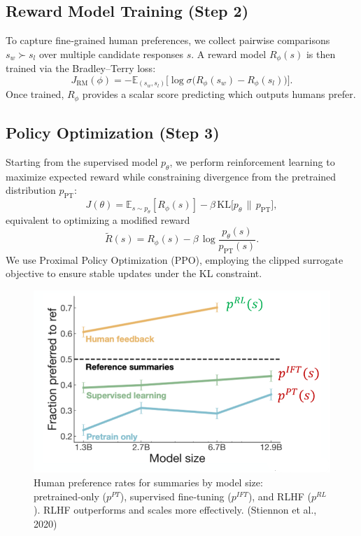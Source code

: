 \documentclass{article}
\begin{document}
\subsection{Reward Model Training (Step 2)}

To capture fine‑grained human preferences, we collect pairwise comparisons \(s_w \succ s_l\) over multiple candidate responses \(s\). A reward model \(R_\phi(s)\) is then trained via the Bradley–Terry loss:
\[
  J_{\mathrm{RM}}(\phi) = -\mathbb{E}_{(s_w,s_l)}\bigl[\log \sigma\bigl(R_\phi(s_w)-R_\phi(s_l)\bigr)\bigr].
\]
Once trained, \(R_\phi\) provides a scalar score predicting which outputs humans prefer.

\subsection{Policy Optimization (Step 3)}

Starting from the supervised model \(p_\theta\), we perform reinforcement learning to maximize expected reward while constraining divergence from the pretrained distribution \(p_{\mathrm{PT}}\):
\[
  J(\theta) = \mathbb{E}_{s\sim p_\theta}[R_\phi(s)] - \beta\,\mathrm{KL}\bigl[p_\theta \,\|\, p_{\mathrm{PT}}\bigr],
\]
equivalent to optimizing a modified reward
\[
  \widetilde R(s) = R_\phi(s) - \beta\,\log\frac{p_\theta(s)}{p_{\mathrm{PT}}(s)}.
\]
We use Proximal Policy Optimization (PPO), employing the clipped surrogate objective to ensure stable updates under the KL constraint.

\begin{figure}[ht]
    \centering
    \includegraphics[width=0.65\linewidth]{graphics/S11RLHF/performance_rlhf.png}
    \caption{Human preference rates for summaries by model size: pretrained‑only (\(p^{PT}\)), supervised fine‑tuning (\(p^{IFT}\)), and RLHF (\(p^{RL}\)). RLHF outperforms and scales more effectively. (Stiennon et al., 2020)}
    \label{fig:performance-rlhf}
\end{figure}
\end{document}
